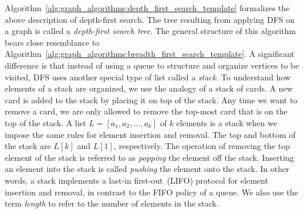Algorithm~\ref{alg:graph_algorithms:depth_first_search_template}
formalizes the above description of depth-first search. The tree
resulting from applying DFS on a graph is called a
\emph{depth-first search tree}. The general structure of this
algorithm bears close resemblance to
Algorithm~\ref{alg:graph_algorithms:breadth_first_search_template}. A
significant difference is that instead of using a queue to structure
and organize vertices to be visited, DFS uses another special type of
list called a \emph{stack}. To understand how elements of a stack are
organized, we use the analogy of a stack of cards. A new card is added
to the stack by placing it on top of the stack. Any time we want to
remove a card, we are only allowed to remove the top-most card that is
on the top of the stack. A list $L = [a_1, a_2, \dots, a_k]$ of $k$
elements is a stack when we impose the same rules for element
insertion and removal. The top and bottom of the stack are $L[k]$ and
$L[1]$, respectively. The operation of removing the top element of the
stack is referred to as \emph{popping} the element off the
stack. Inserting an element into the stack is called \emph{pushing}
the element onto the stack. In other words, a stack implements a
last-in first-out~(LIFO) protocol for element insertion and removal,
in contrast to the FIFO policy of a queue. We also use the term
\emph{length} to refer to the number of elements in the stack.

